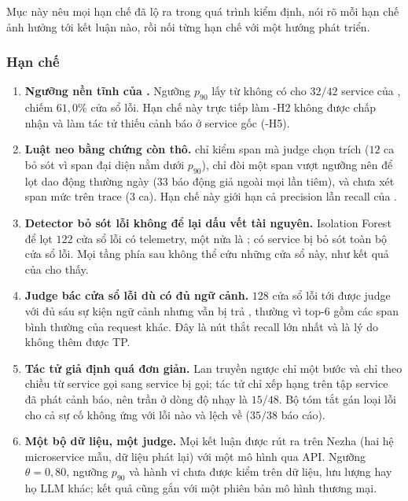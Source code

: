 Mục này nêu mọi hạn chế đã lộ ra trong quá trình kiểm định, nói rõ mỗi hạn chế ảnh hưởng tới kết luận nào, rồi nối từng hạn chế với một hướng phát triển.

\subsubsection{Hạn chế}
\label{sec:ch8-han-che-list}

\begin{enumerate}[label=(\arabic*)]
  \item \textbf{Ngưỡng nền tĩnh của .} Ngưỡng $p_{90}$ lấy từ  không có cho $32/42$ service của , chiếm $61{,}0\%$ cửa sổ lỗi. Hạn chế này trực tiếp làm \hyp{H2} không được chấp nhận và làm tác tử  thiếu cảnh báo ở service gốc (\hyp{H5}).
  \item \textbf{Luật neo bằng chứng còn thô.}  chỉ kiểm span mà judge chọn trích ($12$ ca bỏ sót vì span đại diện nằm dưới $p_{90}$), chỉ đòi một span vượt ngưỡng nên để lọt dao động thường ngày ($33$ báo động giả ngoài mọi lần tiêm), và chưa xét span mức  trên trace ($3$ ca). Hạn chế này giới hạn cả precision lẫn recall của \CTAV{}.
  \item \textbf{Detector bỏ sót lỗi không để lại dấu vết tài nguyên.} Isolation Forest để lọt $122$ cửa sổ lỗi có telemetry, một nửa là ; có service bị bỏ sót toàn bộ cửa sổ lỗi. Mọi tầng phía sau không thể cứu những cửa sổ này, như kết quả của  cho thấy.
  \item \textbf{Judge bác cửa sổ lỗi dù có đủ ngữ cảnh.} $128$ cửa sổ lỗi tới được judge với đủ sáu sự kiện ngữ cảnh nhưng vẫn bị trả , thường vì top-6 gồm các span bình thường của request khác. Đây là nút thắt recall lớn nhất và là lý do  không thêm được TP.
  \item \textbf{Tác tử  giả định quá đơn giản.} Lan truyền ngược chỉ một bước và chỉ theo chiều từ service gọi sang service bị gọi; tác tử chỉ xếp hạng trên tập service đã phát cảnh báo, nên trần  ở dòng độ nhạy là $15/48$. Bộ tóm tắt gán loại lỗi cho cả sự cố không ứng với lỗi nào và lệch về  ($35/38$ báo cáo).
  \item \textbf{Một bộ dữ liệu, một judge.} Mọi kết luận được rút ra trên Nezha (hai hệ microservice mẫu, dữ liệu phát lại) với một mô hình  qua API. Ngưỡng $\theta = 0{,}80$, ngưỡng $p_{90}$ và hành vi  chưa được kiểm trên dữ liệu, lưu lượng hay họ LLM khác; kết quả cũng gắn với một phiên bản mô hình thương mại.

\end{enumerate}
